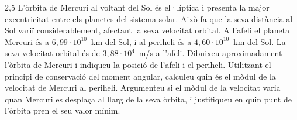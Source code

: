 \begin{apartat}{2,5}
L'òrbita de Mercuri al voltant del Sol és el·líptica i presenta la major excentricitat entre els planetes del sistema solar. Això fa que la seva distància al Sol variï considerablement, afectant la seva velocitat orbital. A l'afeli el planeta Mercuri és a $6,99\cdot 10^{10}$~km del Sol, i al periheli és a $4,60\cdot 10^{10}$~km del Sol. La seva velocitat orbital és de $3,88\cdot 10^{4}$~m/s a l'afeli. Dibuixeu aproximadament l'òrbita de Mercuri i indiqueu la posició de l'afeli i el periheli. Utilitzant el principi de conservació del moment angular, calculeu quin és el mòdul de la velocitat de Mercuri al periheli. Argumenteu si el mòdul de la velocitat varia quan Mercuri es desplaça al llarg de la seva òrbita, i justifiqueu en quin punt de l'òrbita pren el seu valor mínim.
\end{apartat}
